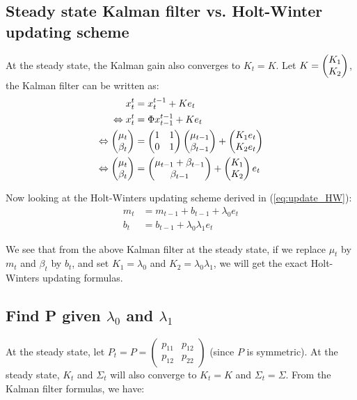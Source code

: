 \subsection{Steady state Kalman filter vs. Holt-Winter updating scheme}
At the steady state, the Kalman gain also converges to $K_t = K$. Let $K = \colvec{K_1}{K_2}$, the Kalman filter can be written as:
\begin{equation}
\begin{split}
x^t_t &= x^{t-1}_t + Ke_t \\
\Leftrightarrow x^t_t &= \Phi x^{t-1}_{t-1} + Ke_t\\
\Leftrightarrow \colvec{\mu_t}{\beta_t} &= \begin{pmatrix}1 & 1\\0 & 1\end{pmatrix} \colvec{\mu_{t-1}}{\beta_{t-1}} + \colvec{K_1 e_t}{K_2 e_t}\\
\Leftrightarrow \colvec{\mu_t}{\beta_t}& = \colvec{\mu_{t-1}+\beta_{t-1}}{\beta_{t-1}} + \colvec{K_1}{K_2}e_t
\end{split}
\end{equation}

Now looking at the Holt-Winters updating scheme derived in (\ref{eq:update_HW}):
\begin{equation}
\begin{split}
m_t &= m_{t-1} +  b_{t-1} + \lambda_0e_t\\
b_t &= b_{t-1} + \lambda_0\lambda_1 e_t
\end{split}
\end{equation}

 We see that from the above Kalman filter at the steady state, if we replace $\mu_t$ by $m_t$ and $\beta_t$ by $b_t$, and set $K_1 = \lambda_0$ and $K_2 = \lambda_0\lambda_1$, we will get the exact Holt-Winters updating formulas.

\subsection{Find P given $\lambda_0$ and $\lambda_1$}
At the steady state, let $P_t = P = \begin{pmatrix}p_{11} & p_{12}\\p_{12} & p_{22}\end{pmatrix}$ (since $P$ is symmetric). At the steady state, $K_t$ and $\Sigma_t$ will also converge to $K_t = K$ and $\Sigma_t = \Sigma$. From the Kalman filter formulas, we have:

